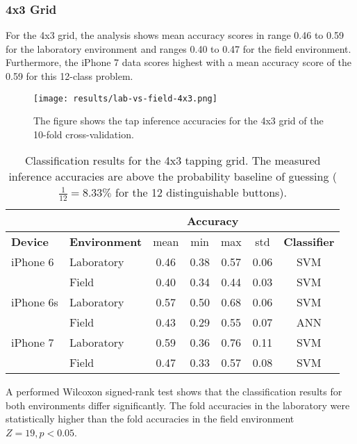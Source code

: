 \subsubsection{4x3 Grid}

For the 4x3 grid, the analysis shows mean accuracy scores in range 0.46 to 0.59 for the laboratory environment and ranges 0.40 to 0.47 for the field environment. Furthermore, the iPhone 7 data scores highest with a mean accuracy score of the 0.59 for this 12-class problem.

\begin{figure}[h!]
  \centering
  \texttt{[image: results/lab-vs-field-4x3.png]}
  \caption{The figure shows the tap inference accuracies for the 4x3 grid of the 10-fold cross-validation.} \label{fig:participation}
\end{figure}

\begin{table}[h!]
  \centering
\begin{tabular}{|l|l|c|c|c|c|c|}
  \cline{3-6}
  \multicolumn{2}{c}{} & \multicolumn{4}{|c|}{\textbf{Accuracy}}  \\
  \hline
  \textbf{Device} & \textbf{Environment} & mean &   min &   max  & std &  \textbf{Classifier} \\
  \hline
  iPhone 6 & Laboratory &      0.46 &     0.38 &     0.57 &     0.06 &  SVM \\
  & Field &      0.40 &     0.34 &     0.44 &     0.03 &  SVM \\
  \hline
iPhone 6s  & Laboratory &      0.57 &     0.50 &     0.68 &     0.06 &  SVM \\
 &   Field    &      0.43 &     0.29 &     0.55 &     0.07 &  ANN \\
 \hline
iPhone 7   & Laboratory &      0.59 &     0.36 &     0.76 &     0.11 &  SVM \\
& Field &      0.47 &     0.33 &     0.57 &     0.08 &  SVM \\
  \hline
\end{tabular}
  \caption{Classification results for the 4x3 tapping grid. The measured inference accuracies are above the probability baseline of guessing ($\frac{1}{12}= 8.33\%$ for the 12 distinguishable buttons).}
\end{table}

A performed Wilcoxon signed-rank test shows that the classification results for both environments differ significantly. The fold accuracies in the laboratory were statistically higher than the fold accuracies in the field environment $Z = 19, p < 0.05$.

